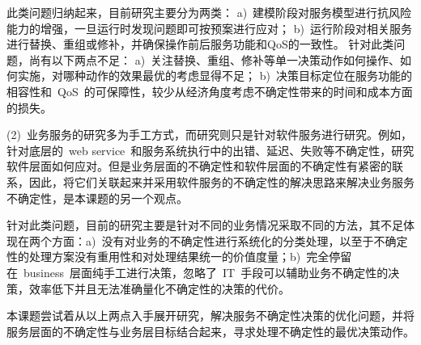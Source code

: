 此类问题归纳起来，目前研究主要分为两类：
a)~建模阶段对服务模型进行抗风险能力的增强，一旦运行时发现问题即可按预案进行应对；
b)~运行阶段对相关服务进行替换、重组或修补，并确保操作前后服务功能和QoS的一致性。
针对此类问题，尚有以下两点不足：
a)~关注替换、重组、修补等单一决策动作如何操作、如何实施，对哪种动作的效果最优的考虑显得不足；
b)~决策目标定位在服务功能的相容性和~QoS~的可保障性，较少从经济角度考虑不确定性带来的时间和成本方面的损失。

(2)~业务服务的研究多为手工方式，而研究则只是针对软件服务进行研究。例如，针对底层的~web service~和服务系统执行中的出错、延迟、失败等不确定性，研究软件层面如何应对。但是业务层面的不确定性和软件层面的不确定性有紧密的联系，因此，将它们关联起来并采用软件服务的不确定性的解决思路来解决业务服务不确定性，是本课题的另一个观点。

针对此类问题，目前的研究主要是针对不同的业务情况采取不同的方法，其不足体现在两个方面：a)~没有对业务的不确定性进行系统化的分类处理，以至于不确定性的处理方案没有重用性和对处理结果统一的价值度量；b)~完全停留在~business~层面纯手工进行决策，忽略了~IT~手段可以辅助业务不确定性的决策，效率低下并且无法准确量化不确定性的决策的代价。

本课题尝试着从以上两点入手展开研究，解决服务不确定性决策的优化问题，并将服务层面的不确定性与业务层目标结合起来，寻求处理不确定性的最优决策动作。




